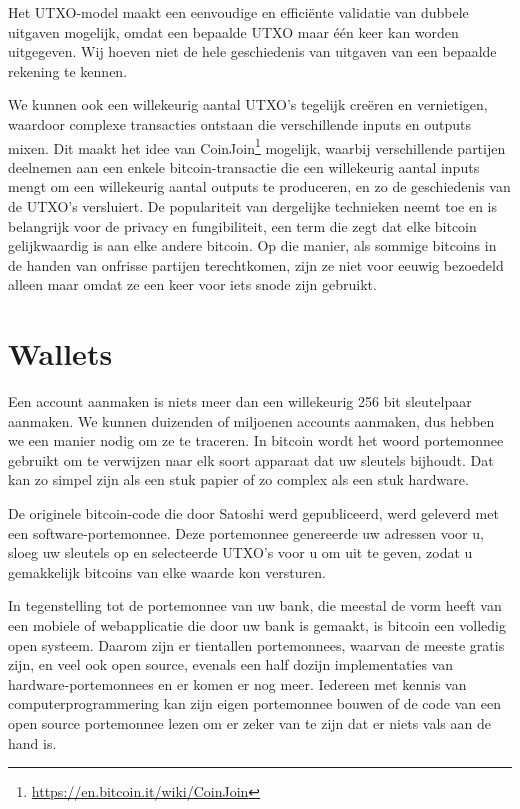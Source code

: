 \documentclass[smalldemyvopaper,11pt,twoside,onecolumn,openright,extrafontsizes]{memoir}
\begin{document}
Het UTXO-model maakt een eenvoudige en efficiënte validatie van dubbele uitgaven mogelijk, omdat een bepaalde UTXO maar één keer kan worden uitgegeven. Wij hoeven niet de hele geschiedenis van uitgaven van een bepaalde rekening te kennen.

We kunnen ook een willekeurig aantal UTXO's tegelijk creëren en vernietigen, waardoor complexe transacties ontstaan die verschillende inputs en outputs mixen. Dit maakt het idee van CoinJoin\footnote{\href{https://en.bitcoin.it/wiki/CoinJoin}{https://en.bitcoin.it/wiki/CoinJoin}} mogelijk, waarbij verschillende partijen deelnemen aan een enkele bitcoin-transactie die een willekeurig aantal inputs mengt om een willekeurig aantal outputs te produceren, en zo de geschiedenis van de UTXO's versluiert. De populariteit van dergelijke technieken neemt toe en is belangrijk voor de privacy en fungibiliteit, een term die zegt dat elke bitcoin gelijkwaardig is aan elke andere bitcoin. Op die manier, als sommige bitcoins in de handen van onfrisse partijen terechtkomen, zijn ze niet voor eeuwig bezoedeld alleen maar omdat ze een keer voor iets snode zijn gebruikt.

\section{Wallets}

Een account aanmaken is niets meer dan een willekeurig 256 bit sleutelpaar aanmaken. We kunnen duizenden of miljoenen accounts aanmaken, dus hebben we een manier nodig om ze te traceren. In bitcoin wordt het woord portemonnee gebruikt om te verwijzen naar elk soort apparaat dat uw sleutels bijhoudt. Dat kan zo simpel zijn als een stuk papier of zo complex als een stuk hardware. 

De originele bitcoin-code die door Satoshi werd gepubliceerd, werd geleverd met een software-portemonnee. Deze portemonnee genereerde uw adressen voor u, sloeg uw sleutels op en selecteerde UTXO's voor u om uit te geven, zodat u gemakkelijk bitcoins van elke waarde kon versturen. 

In tegenstelling tot de portemonnee van uw bank, die meestal de vorm heeft van een mobiele of webapplicatie die door uw bank is gemaakt, is bitcoin een volledig open systeem. Daarom zijn er tientallen portemonnees, waarvan de meeste gratis zijn, en veel ook open source, evenals een half dozijn implementaties van hardware-portemonnees en er komen er nog meer. Iedereen met kennis van computerprogrammering kan zijn eigen portemonnee bouwen of de code van een open source portemonnee lezen om er zeker van te zijn dat er niets vals aan de hand is. 
\end{document}
